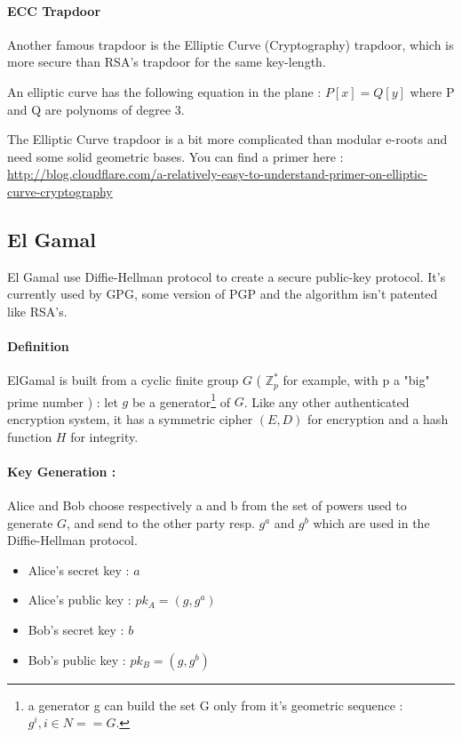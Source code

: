 \paragraph{ECC Trapdoor}

Another famous trapdoor is the Elliptic Curve (Cryptography) trapdoor, which is more secure than RSA's trapdoor for the same key-length. \\

\begin{mydef}
An elliptic curve has the following equation in the plane : $P[x] = Q[y]$ where P and Q are polynoms of degree 3.
\end{mydef}

The Elliptic Curve trapdoor is a bit more complicated than modular e-roots and need some solid geometric bases. You can find a primer here : \url{http://blog.cloudflare.com/a-relatively-easy-to-understand-primer-on-elliptic-curve-cryptography}


\subsection{El Gamal}

El Gamal use Diffie-Hellman protocol to create a secure public-key protocol. It's currently used by GPG, some version of PGP and the algorithm isn't patented like RSA's. 

\paragraph{Definition \\}

ElGamal is built from a cyclic finite group $G$ ( $\mathbb{Z}_p^*$ for example, with p a "big" prime number ) : let $g$ be a generator\footnote{a generator g can build the set G only from it's geometric sequence : ${g^i, i\in N} == G$.}  of $G$. Like any other authenticated encryption system, it has a symmetric cipher $(E,D)$ for encryption and a hash function $H$ for integrity.

\paragraph{Key Generation :}
 Alice and Bob choose respectively a and b from the set of powers used to generate $G$, and send to the other party resp. $g^a$ and $g^b$ which are used in the Diffie-Hellman protocol. 
 
\begin{itemize}
	\item Alice's secret key : $a$
	\item Alice's public key : $pk_A = (g, g^a)$
	\item Bob's secret key : $b$
	\item Bob's public key : $pk_B = (g, g^b)$
\end{itemize}
 
